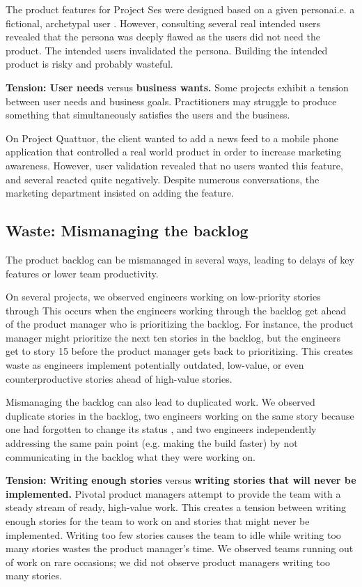 The product features for Project Ses were designed based on a given persona\textemdash i.e. a fictional, archetypal user \cite{Grudin2002personas}. However, consulting several real intended users revealed that the persona was deeply flawed as the users did not need the product. The intended users invalidated the persona. Building the intended product is risky and probably wasteful. 

\textbf{Tension: User needs} versus \textbf{business wants.}
Some projects exhibit a tension between user needs and business goals. Practitioners may struggle to produce something that simultaneously satisfies the users and the business.

On Project Quattuor, the client wanted to add a news feed to a mobile phone application that controlled a real world product in order to increase marketing awareness. However, user validation revealed that no users wanted this feature, and several reacted quite negatively. Despite numerous conversations, the marketing department insisted on adding the feature. 
\subsection{Waste: Mismanaging the backlog}
The product backlog can be mismanaged in several ways, leading to delays of key features or lower team productivity. 

On several projects, we observed engineers working on low-priority stories through  This occurs when the engineers working through the backlog get ahead of the product manager who is prioritizing the backlog. For instance, the product manager might prioritize the next ten stories in the backlog, but the engineers get to story 15 before the product manager gets back to prioritizing. This creates waste as engineers implement potentially outdated, low-value, or even counterproductive stories ahead of high-value stories.   

Mismanaging the backlog can also lead to duplicated work. We observed duplicate stories in the backlog, two engineers working on the same story because one had forgotten to change its status , and two engineers independently addressing the same pain point (e.g. making the build faster) by not communicating in the backlog what they were working on.

\textbf{Tension: Writing enough stories} versus \textbf{writing stories that will never be implemented.}
Pivotal product managers attempt to provide the team with a steady stream of ready, high-value work. This creates a tension between writing enough stories for the team to work on and  stories that might never be implemented. Writing too few stories causes the team to idle while writing too many stories wastes the product manager's time. We observed teams running out of work on rare occasions; we did not observe product managers writing too many stories.  

